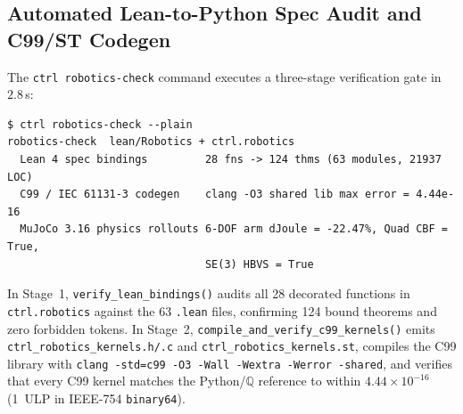 \documentclass[10pt,twocolumn]{article}
\theoremstyle{definition}
\begin{document}
\subsection{Automated Lean-to-Python Spec Audit and C99/ST Codegen}
The \texttt{ctrl robotics-check} command executes a three-stage verification gate in $2.8\,$s:
\begin{lstlisting}
$ ctrl robotics-check --plain
robotics-check  lean/Robotics + ctrl.robotics
  Lean 4 spec bindings         28 fns -> 124 thms (63 modules, 21937 LOC)
  C99 / IEC 61131-3 codegen    clang -O3 shared lib max error = 4.44e-16
  MuJoCo 3.16 physics rollouts 6-DOF arm dJoule = -22.47%, Quad CBF = True,
                               SE(3) HBVS = True
\end{lstlisting}
In Stage~1, \texttt{verify\_lean\_bindings()} audits all 28 decorated functions in \texttt{ctrl.robotics} against the 63 \texttt{.lean} files, confirming 124 bound theorems and zero forbidden tokens. In Stage~2, \texttt{compile\_and\_verify\_c99\_kernels()} emits \texttt{ctrl\_robotics\_kernels.h/.c} and \texttt{ctrl\_robotics\_kernels.st}, compiles the C99 library with \texttt{clang -std=c99 -O3 -Wall -Wextra -Werror -shared}, and verifies that every C99 kernel matches the Python/$\mathbb{Q}$ reference to within $4.44 \times 10^{-16}$ (1~ULP in IEEE-754 \texttt{binary64}).
\end{document}
